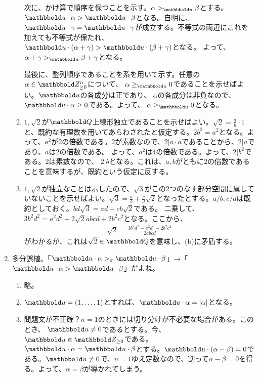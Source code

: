 \begin{enumerate}[label=(問題\arabic*)]
\begin{enumerate}[label=(\alph*)]
   次に、かけ算で順序を保つことを示す。$\alpha >_{\bbold u} \beta$とする。
   $\bbold u\cdot \alpha > \bbold u\cdot \beta$となる。自明に、
   $\bbold u \cdot \gamma = \bbold u\cdot \gamma$が成立する。不等式の両辺にこれを加えても不等式が保たれ、$\bbold u\cdot (\alpha + \gamma ) > \bbold u\cdot (\beta +\gamma)$となる。
   よって、$\alpha + \gamma >_{\bbold u} \beta + \gamma$となる。

   最後に、整列順序であることを系を用いて示す。任意の$\alpha \in \Zge^n$について、
   $\alpha \ge_{\bbold u} 0$であることを示せばよい。$\bbold u$の各成分は正であり、
   $\alpha$の各成分は非負なので、$\bbold u\cdot \alpha \ge 0$である。よって、
   $\alpha \ge_{\bbold u} 0$となる。

   \item $1,\sqrt{2}$が$\Q$上線形独立であることを示せばよい。$\sqrt{2} = \frac{a}{b}\cdot 1$と、既約な有理数を用いてあらわされたと仮定する。$2b^2 = a^2$となる。よって、$a^2$が$2$の倍数である。$2$が素数なので、$2|a\cdot a$であることから、$2|a$であり、$a$は$2$の倍数である。
   よって、$a^2$は$4$の倍数である。よって、$2|b^2$である。$2$は素数なので、
   $2|b$となる。これは、$a,b$がともに$2$の倍数であることを意味するが、既約という仮定に反する。

   \item $1,\sqrt{2}$が独立なことは示したので、$\sqrt{3}$がこの2つのなす部分空間に属していないことを示せばよい。$\sqrt{3} = \frac{a}{b} + \frac{c}{d}\sqrt{2}$となったとする。$a/b,c/d$は既約としておく。$bd\sqrt{3} = ad + cb\sqrt{2}$である。
   二乗して、$3 b^2d^2 = a^2d^2 + 2\sqrt{2}abcd + 2b^2c^2$となる。ここから、
   \begin{align}
     \sqrt{2} = \frac{3b^2d^2 - a^2d^2 - 2b^2c^2}{2abcd}
   \end{align}
   がわかるが、これは$\sqrt{2} \in \Q$を意味し、(b)に矛盾する。
 \end{enumerate}
 \item
 多分誤植。「$\bbold u\cdot \alpha >_\sigma \bbold u\cdot \beta$」→「$\bbold u\cdot \alpha > \bbold u\cdot \beta$」だよね。
 \begin{enumerate}[label=(\alph*)]
   \item 略。
   \item $\bbold u = (1,\dots, 1)$とすれば、$\bbold u\cdot \alpha = \myabs{\alpha}$となる。
   \item 問題文が不正確？$n=1$のときには切り分けが不必要な場合がある。このとき、
   $\bbold u \neq 0$であるとする。今、$\bbold u \in \Zge$である。
   $\bbold u\cdot \alpha = \bbold u\cdot \beta$とする。$\bbold u\cdot (\alpha-\beta) = 0$である。$\bbold u \neq 0$で、$n=1$ゆえ定数なので、割って$\alpha -\beta = 0$を得る。よって、$\alpha = \beta$が導かれてしまう。


\end{enumerate}
\end{enumerate}
